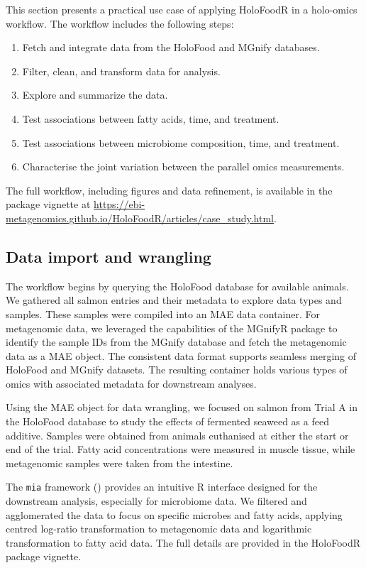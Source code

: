 \documentclass[unnumsec,webpdf,namedate,modern,large]{oup-authoring-template}%
\begin{document}
This section presents a practical use case of applying HoloFoodR in a holo-omics workflow.
The workflow includes the following steps:

\begin{enumerate}
    \item Fetch and integrate data from the HoloFood and MGnify databases.
    \item Filter, clean, and transform data for analysis.
    \item Explore and summarize the data.
    \item Test associations between fatty acids, time, and treatment.
    \item Test associations between microbiome composition, time, and treatment.
    \item Characterise the joint variation between the parallel omics measurements.
\end{enumerate}

The full workflow, including figures and data refinement, is available in the package vignette at \url{https://ebi-metagenomics.github.io/HoloFoodR/articles/case_study.html}.

\vspace{-1em}
\subsection{Data import and wrangling}

The workflow begins by querying the HoloFood database for available animals. We gathered all salmon entries and their metadata to explore data types and samples. These samples were compiled into an MAE data container. For metagenomic data, we leveraged the capabilities of the MGnifyR package to identify the sample IDs from the MGnify database and fetch the metagenomic data as a MAE object. The consistent data format supports  seamless merging of HoloFood and MGnify datasets. The resulting container holds various types of omics with associated metadata for downstream analyses.

Using the MAE object for data wrangling, we focused on salmon from Trial A in the HoloFood database to study the effects of fermented seaweed as a feed additive. Samples were obtained from animals euthanised at either the start or end of the trial. Fatty acid concentrations were measured in muscle tissue, while metagenomic samples were taken from the intestine.

The \texttt{mia} framework (\cite{mia, miaViz}) provides an intuitive R interface designed for the downstream analysis, especially for microbiome data. We filtered and agglomerated the data to focus on specific microbes and fatty acids, applying centred log-ratio transformation to metagenomic data and logarithmic transformation to fatty acid data. The full details are provided in the HoloFoodR package vignette.
\end{document}
